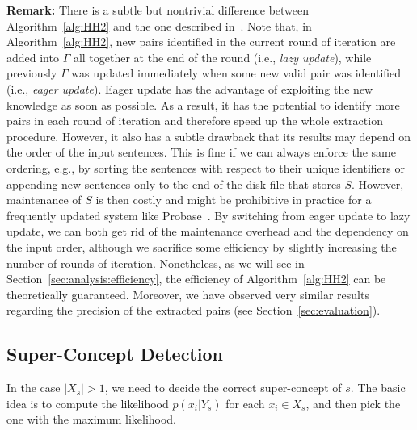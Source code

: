 \documentclass[10pt,journal,cspaper,compsoc]{IEEEtran}
\newcommand{\blankline}{\vspace*{2ex}}
\newcommand{\remark}[1]{\blankline\noindent\textbf{Remark: }#1}
\begin{document}
\remark{There is a subtle but nontrivial difference between Algorithm~\ref{alg:HH2} and the one described in~\cite{WuLWZ12:Probase}. Note that, in Algorithm~\ref{alg:HH2}, new pairs identified in the current round of iteration are added into $\Gamma$ all together at the end of the round (i.e., \emph{lazy update}), while previously $\Gamma$ was updated immediately when some new valid pair was identified (i.e., \emph{eager update}). Eager update has the advantage of exploiting the new knowledge as soon as possible. As a result, it has the potential to identify more pairs in each round of iteration and therefore speed up the whole extraction procedure. However, it also has a subtle drawback that its results may depend on the order of the input sentences. This is fine if we can always enforce the same ordering, e.g., by sorting the sentences with respect to their unique identifiers or appending new sentences only to the end of the disk file that stores $S$. However, maintenance of $S$ is then costly and might be prohibitive in practice for a frequently updated system like Probase~\cite{WuLWZ12:Probase}. By switching from eager update to lazy update, we can both get rid of the maintenance overhead and the dependency on the input order, although we sacrifice some efficiency by slightly increasing the number of rounds of iteration. Nonetheless, as we will see in Section~\ref{sec:analysis:efficiency}, the efficiency of Algorithm~\ref{alg:HH2} can be theoretically guaranteed. Moreover, we have observed very similar results regarding the precision of the extracted pairs (see Section~\ref{sec:evaluation}).}

\subsection{Super-Concept Detection}

In the case $|X_s|>1$, we need to decide the correct super-concept of $s$. The basic idea is to compute the likelihood $p(x_i|Y_s)$
for each $x_i\in X_s$, and then pick the one with the maximum likelihood. 
\end{document}

